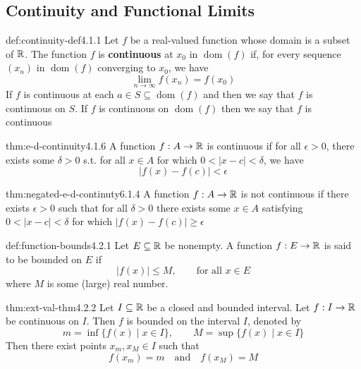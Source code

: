 \documentclass[landscape, 8pt]{extarticle}
\DeclareMathOperator{\dom}{dom}
\begin{document}
\begin{multicols}{3}
\newpage



\subsection*{Continuity and Functional Limits}

\begin{dfn}[Continuity]{def:continuity-def}{4.1.1}
    Let $f$ be a real-valued function whose domain is a subset of $\mathbb{R}$. The function $f$ is \textbf{continuous} at $x_{0}$ in $\dom{(f)}$ if, for every sequence $(x_{n})$ in $\dom{(f)}$ converging to $x_{0}$, we have 
    \[\displaystyle\lim_{ n \to \infty }f(x_{n})=f(x_{0})\]
    If $f$ is continuous at each $a\in S \subseteq \dom{(f)}$ and then we say that $f$ is continuous on $S$. If $f$ is continuous on $\dom{(f)}$ then we say that $f$ is continuous
\end{dfn}
\vspace{-5pt}

\begin{thm}{thm:e-d-continuity}{4.1.6}
    A function $f:A\to\mathbb{R}$ is continuous if for all $\epsilon>0$, there exists some $\delta>0$ s.t. for all $x \in A$ for which $0<\lvert x-c \rvert <\delta$, we have 
    \[\lvert f(x)-f(c) \rvert < \epsilon\]
\end{thm}
\vspace{-5pt}

\begin{thm}{thm:negated-e-d-continuty}{6.1.4}
    A function $f:A\to\mathbb{R}$ is not continuous if there exists $\epsilon>0$ such that for all $\delta>0$ there exists some $x \in A$ satisfying $0<\lvert x-c \rvert<\delta$ for which $\lvert  f(x)-f(c) \rvert\ge \epsilon$
\end{thm}
\vspace{-5pt}

\begin{dfn}{def:function-bounds}{4.2.1}
Let $E\subseteq\mathbb{R}$ be nonempty. A function $f:E\to \mathbb{R}$ is said to be bounded on $E$ if
\[\lvert f(x)\rvert \le M,\qquad \text{for all } x\in E\]
where $M$ is some (large) real number.
\end{dfn}
\vspace{-5pt}

\begin{thm}{thm:ext-val-thm}{4.2.2}
Let $I\subseteq \mathbb{R}$ be a closed and bounded interval. Let $f:I\to \mathbb{R}$ be continuous on $I$. Then $f$ is bounded on the interval $I$, denoted by
\[m = \inf\{f(x)\mid x\in I\},\qquad M = \sup\{f(x)\mid x\in I\}\]
Then there exist points $x_{m}, x_{M}\in I$ such that
\[f(x_{m}) = m \quad \text{and} \quad f(x_{M}) = M\]
\end{thm}
\vspace{-5pt}


\end{multicols}
\end{document}
